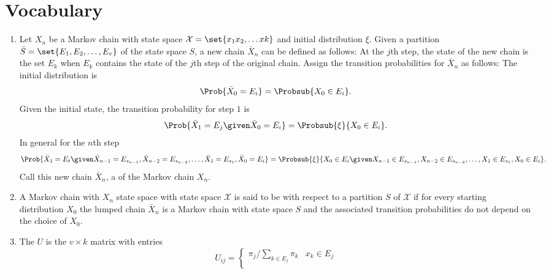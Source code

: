 \documentclass[12pt]{article}
\begin{document}
\hr

\section*{Vocabulary}
\begin{enumerate}
    \item
        Let \( X_n \) be a Markov chain with state space \( \mathcal{X}
        = \set{x_1 x_2, \dots x k} \) and initial distribution \( \xi \).
        Given a partition \( \bar{S} = \set{E_1, E_2, \dots, E_v} \) of
        the state space \( S \), a new chain \( \bar{X}_n \) can be
        defined as follows:  At the \( j \)th step, the state of the new
        chain is the set \( E_k \) when \( E_k \) contains the state of
        the \( j \)th step of the original chain.  Assign the transition
        probabilities for \( \bar{X}_n \) as follows: The initial
        distribution is
        \[
            \Prob{\bar{X}_0 = E_i} = \Probsub{X_0 \in E_i}.
        \] Given the initial state, the transition probability for step \(
        1 \) is
        \[
            \Prob{\bar{X}_1 = E_j \given \bar{X}_0 = E_i} = \Probsub{\xi}
            {X_0 \in E_i }.
        \] In general for the \( n \)th step
        \[
            \Prob{\bar{X}_1 = E_t \given \bar{X}_{n-1} = E_{s_{n-1}},
            \bar{X}_{n-2} = E_{s_{n-2}}, \dots, \bar{X}_1 = E_{s_1},
            \bar{X}_0 = E_i} = \Probsub{\xi}{X_0 \in E_i \given X_{n-1}
            \in E_{s_{n-1}}, X_{n-2} \in E_{s_{n-2}}, \dots, X_1 \in E_{s_1},
            X_0 \in E_i}.
        \] Call this new chain \( \bar{X}_n \), a %
        of the Markov chain \( X_n \).
    \item
        A Markov chain with \( X_n \) state space with state space \(
        \mathcal{X} \) is said to be %
        with respect to a partition \( S \) of \( \mathcal{X} \) if for
        every starting distribution \( X_0 \) the lumped chain \( \bar{X}_n
        \) is a Markov chain with state space \( S \) and the associated
        transition probabilities do not depend on the choice of \( X_0 \).
    \item
        The %
        \( U \) is the \( v \times k \) matrix with entries
        \[
            U_{ij} =
            \begin{cases}
                \pi_j/\sum_{k \in E_j} \pi_k & x_k \in E_j \\

\end{cases}\]
\end{enumerate}
\end{document}
